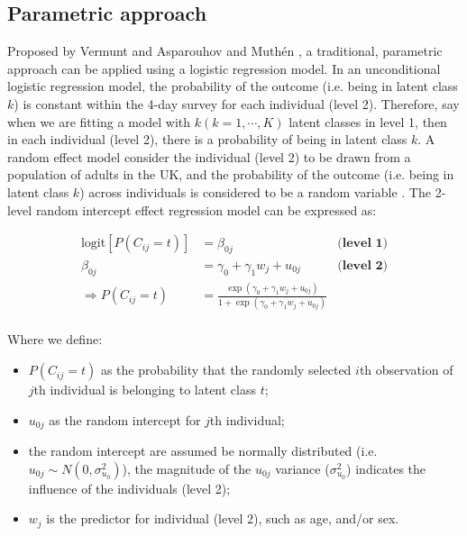 \subsection{Parametric approach}\vspace{-0.3cm}

Proposed by Vermunt \parencite{Vermunt, vermunt2008latent} and Asparouhov and Muth\'en \parencite{muthen2009multilevel},  a traditional, parametric approach can be applied using a logistic regression model. In an unconditional logistic regression model, the probability of the outcome (i.e. being in latent class $k$) is constant within the 4-day survey for each individual (level 2). Therefore, say when we are fitting a model with $k (k = 1, \cdots, K)$ latent classes in level 1, then in each individual (level 2), there is a probability of being in latent class $k$. A random effect model consider the individual (level 2) to be drawn from a population of adults in the UK, and the probability of the outcome (i.e. being in latent class $k$) across individuals is considered to be a random variable \parencite{snijders2011multilevel}. The 2-level random intercept effect regression model can be expressed as:\vspace{-0.4cm}


\begin{equation}
\begin{aligned}
\text{logit}[P(C_{ij} = t)] & = \beta_{0j} & \textbf{(level 1)}  \\
\beta_{0j} & = \gamma_0 + \gamma_1 w_j + u_{0j} & \textbf{(level 2)} \\ 
\Rightarrow P(C_{ij} = t) & = \frac{\exp{(\gamma_0 + \gamma_1 w_j + u_{0j})}}{1 + \exp{(\gamma_0 + \gamma_1 w_j + u_{0j})}} \\
\end{aligned}
\label{randomLCA}
\end{equation}
\vspace{-0.3cm}

Where we define: 

\begin{itemize}
	\item $P(C_{ij} = t)$ as the probability that the randomly selected $i$th observation of $j$th individual is belonging to latent class $t$;
	\item $u_{0j}$ as the random intercept for $j$th individual; 
	\item the random intercept are assumed be normally distributed (i.e. $u_{0j} \sim N(0, \sigma_{u_0}^2)$), the magnitude of the $u_{0j}$ variance ($\sigma_{u_0}^2$) indicates the influence of the individuals (level 2);
	\item $w_j$ is the predictor for individual (level 2), such as age, and/or sex.
\end{itemize}


